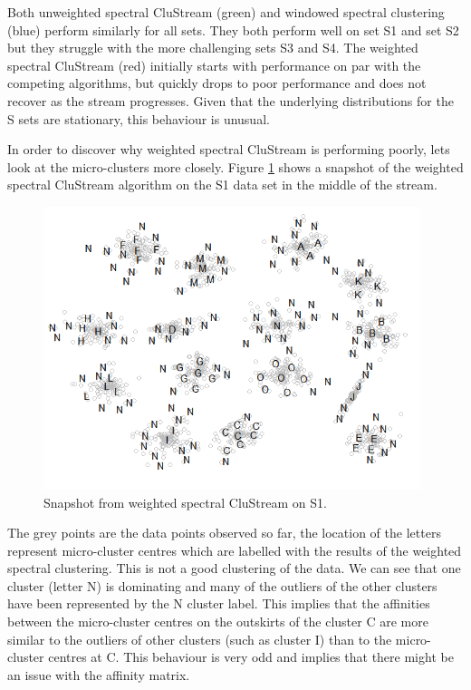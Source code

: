 Both unweighted spectral CluStream (green) and windowed spectral clustering (blue) perform similarly for all sets.  They both perform well on set S1 and set S2 but they struggle with the more challenging sets S3 and S4.   The weighted spectral CluStream (red) initially starts with performance on par with the competing algorithms, but quickly drops to poor performance and does not recover as the stream progresses. Given that the underlying distributions for the S sets are stationary, this behaviour is unusual.


In order to discover why weighted spectral CluStream is performing poorly, lets look at the micro-clusters more closely. Figure \ref{fig:weighted_issues} shows a snapshot of the weighted spectral CluStream algorithm on the S1 data set in the middle of the stream.

\begin{figure}[h!]
  \centering
  \includegraphics[width = 11cm]{weighted_issues_N_crop}
  \caption{Snapshot from weighted spectral CluStream on S1.}
\label{fig:weighted_issues}
\end{figure}

The grey points are the data points observed so far, the location of the letters represent micro-cluster centres which are labelled with the results of the weighted spectral clustering. This is not a good clustering of the data.  We can see that one cluster (letter N) is dominating and many of the outliers of the other clusters have been represented by the N cluster label. This implies that the affinities between the micro-cluster centres on the outskirts of the cluster C are more similar to the outliers of other clusters (such as cluster I) than to the micro-cluster centres at C. This behaviour is very odd and implies that there might be an issue with the  affinity matrix.



